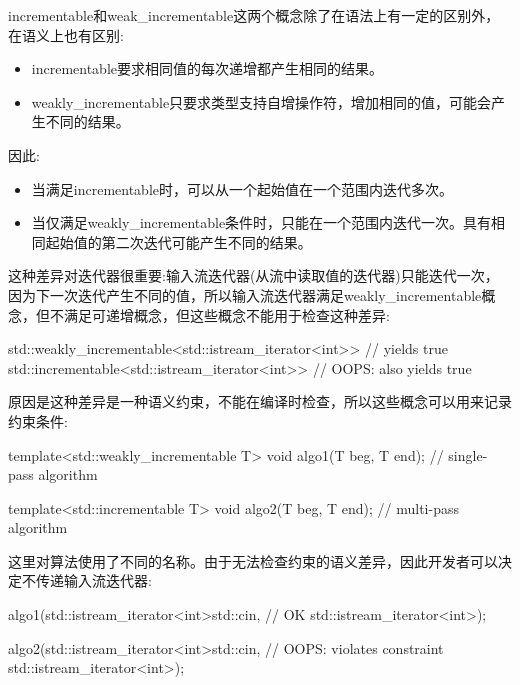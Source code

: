 
incrementable和weak\_incrementable这两个概念除了在语法上有一定的区别外，在语义上也有区别:

\begin{itemize}
\item
incrementable要求相同值的每次递增都产生相同的结果。

\item
weakly\_incrementable只要求类型支持自增操作符，增加相同的值，可能会产生不同的结果。
\end{itemize}

因此:

\begin{itemize}
\item
当满足incrementable时，可以从一个起始值在一个范围内迭代多次。

\item
当仅满足weakly\_incrementable条件时，只能在一个范围内迭代一次。具有相同起始值的第二次迭代可能产生不同的结果。
\end{itemize}

这种差异对迭代器很重要:输入流迭代器(从流中读取值的迭代器)只能迭代一次，因为下一次迭代产生不同的值，所以输入流迭代器满足weakly\_incrementable概念，但不满足可递增概念，但这些概念不能用于检查这种差异:

\begin{cpp}
std::weakly_incrementable<std::istream_iterator<int>> // yields true
std::incrementable<std::istream_iterator<int>> // OOPS: also yields true
\end{cpp}

原因是这种差异是一种语义约束，不能在编译时检查，所以这些概念可以用来记录约束条件:

\begin{cpp}
template<std::weakly_incrementable T>
void algo1(T beg, T end); // single-pass algorithm

template<std::incrementable T>
void algo2(T beg, T end); // multi-pass algorithm
\end{cpp}

这里对算法使用了不同的名称。由于无法检查约束的语义差异，因此开发者可以决定不传递输入流迭代器:

\begin{cpp}
algo1(std::istream_iterator<int>{std::cin}, // OK
	  std::istream_iterator<int>{});

algo2(std::istream_iterator<int>{std::cin}, // OOPS: violates constraint
	  std::istream_iterator<int>{});
\end{cpp}

